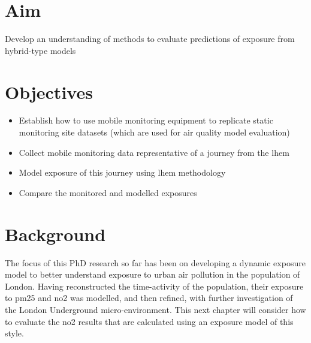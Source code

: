\section{Aim}
\label{sec:4aim}

Develop an understanding of methods to evaluate predictions of exposure from hybrid-type models

\section{Objectives}
\label{sec:4objectives}

\begin{itemize}
    \item Establish how to use mobile monitoring equipment to replicate static monitoring site datasets (which are used for air quality model evaluation)
    \item Collect mobile monitoring data representative of a journey from the \gls{lhem}
    \item Model exposure of this journey using \gls{lhem} methodology
    \item Compare the monitored and modelled exposures
\end{itemize}

\section{Background}
\label{sec:4background}

The focus of this PhD research so far has been on developing a dynamic exposure model to better understand exposure to urban air pollution in the population of London. Having reconstructed the time-activity of the population, their exposure to \gls{pm25} and \gls{no2} was modelled, and then refined, with further investigation of the London Underground micro-environment. This next chapter will consider how to evaluate the \gls{no2} results that are calculated using an exposure model of this style.

